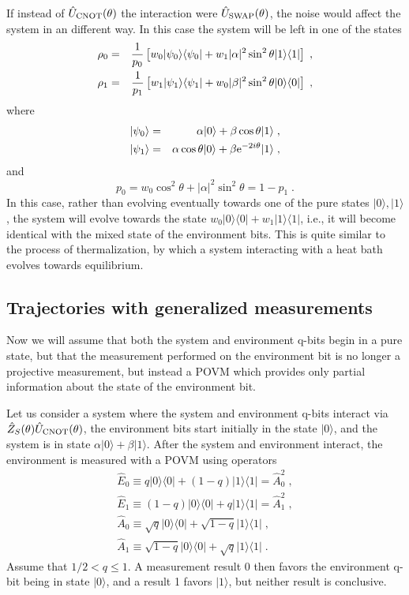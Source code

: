 \documentclass[12pt]{article}
\def\bra#1{{\langle #1 |}}
\def\ket#1{{| #1 \rangle}}
\def\e{{\rm e}}
\def\U{{\hat U}}
\def\E{{\hat E}}
\def\A{{\hat A}}
\def\Z{{\hat Z}}
\begin{document}
If instead of $\U_{\rm CNOT}(\theta)$ the interaction were
$\U_{\rm SWAP}(\theta)$, the noise would affect the system in an
different way.  In this case the system will be left in one of the
states
\begin{eqnarray}
\rho_0 &=& {1\over p_0}\left[ w_0 \ket{\psi_0}\bra{\psi_0}
  + w_1 |\alpha|^2\sin^2\theta \ket1\bra1 \right] \;, \nonumber\\
\rho_1 &=& {1\over p_1}\left[ w_1 \ket{\psi_1}\bra{\psi_1}
  + w_0 |\beta|^2\sin^2\theta \ket0\bra0 \right] \;,
\end{eqnarray}
where
\begin{eqnarray}
\ket{\psi_0} &=& \alpha\ket0
  + \beta\cos\theta\ket1 \;, \nonumber\\
\ket{\psi_1} &=& \alpha\cos\theta\ket0
  + \beta\e^{-2i\theta}\ket1 \;,
\end{eqnarray}
and
\begin{equation}
p_0 = w_0 \cos^2\theta + |\alpha|^2\sin^2\theta = 1 - p_1 \;.
\end{equation}
In this case, rather than evolving eventually towards one of the pure
states $\ket0,\ket1$, the system will evolve towards the state
$w_0 \ket0\bra0 + w_1\ket1\bra1$, i.e., it will become identical with
the mixed state of the environment bits.  This is quite similar to the
process of thermalization, by which a system interacting with a heat
bath evolves towards equilibrium.


\subsection{Trajectories with generalized measurements}

Now we will assume that both the system and environment q-bits begin
in a pure state, but that the measurement performed on the environment
bit is no longer a projective measurement, but instead a POVM which
provides only partial information about the state of the environment bit.

Let us consider a system where the system and environment q-bits interact
via $\Z_S(\theta)\U_{\rm CNOT}(\theta)$, the environment bits start initially
in the state $\ket0$, and the system is in state $\alpha\ket0+\beta\ket1$.
After the system and environment interact, the environment is measured
with a POVM using operators
\begin{eqnarray}
\E_0 \equiv q \ket0\bra0 + (1-q) \ket1\bra1 = \A_0^2 \;, \nonumber\\
\E_1 \equiv (1-q) \ket0\bra0 + q \ket1\bra1 = \A_1^2 \;, \nonumber\\
\A_0 \equiv \sqrt{q} \ket0\bra0 + \sqrt{1-q} \ket1\bra1 \;, \nonumber\\
\A_1 \equiv \sqrt{1-q} \ket0\bra0 + \sqrt{q} \ket1\bra1 \;.
\end{eqnarray}
Assume that $1/2 < q \le 1$.  A measurement result 0 then favors the
environment q-bit being in state $\ket0$, and a result 1 favors $\ket1$,
but neither result is conclusive.
\end{document}

